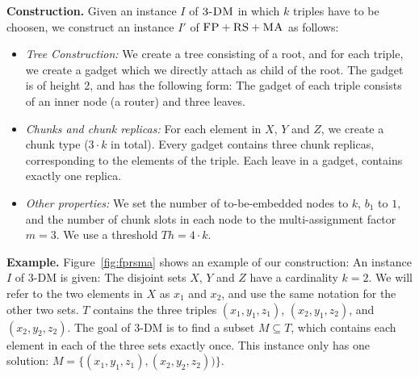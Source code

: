 \documentclass[preprint,12pt]{elsarticle}
\newcommand{\maciek}[1]{\textcolor{brown}{maciek: #1}}
\newcommand{\stefan}[1]{\textcolor{blue}{stefan: #1}}
\newcommand{\MaFactor}{m}
\newcommand{\FP}{\textsc{FP}}
\newcommand{\RS}{\textsc{RS}}
\newcommand{\MA}{\textsc{MA}}
\newcommand{\CostTrans}{\ensuremath{b_1}}
\newcommand{\TDM}{\textsc{3-DM}}
\newcommand{\Thr}{\ensuremath{Th}}
\begin{document}
\textbf{Construction.}
Given an instance $I$ of $\TDM$ in which $k$ triples have to be
choosen, we construct an instance $I'$ of
$\FP+\RS+\MA$ as follows:
\begin{itemize}
\item \emph{Tree Construction:} We create a tree consisting of a root,
and for each triple, we create a gadget which we directly attach as
child of the root. The gadget is of height 2,
and has the following form:
The gadget of each triple consists of an inner node (a router) and three leaves.
\item \emph{Chunks and chunk replicas:} For each element in $X$, $Y$ and $Z$,
 we create a chunk type
($3 \cdot k$ in total). Every gadget contains three chunk replicas,
corresponding to the elements of the triple. Each leave in a gadget, contains
exactly one replica.
\item \emph{Other properties:} We set the number of to-be-embedded nodes to $k$,
$\CostTrans$ to $1$, and the number of chunk slots in each node to the multi-assignment factor
$\MaFactor=3$.
We use a threshold $\Thr= 4
\cdot k$.
\end{itemize}

\textbf{Example.} Figure~\ref{fig:fprsma} shows an example of our construction: An
instance $I$ of 3-DM is given: The disjoint sets $X$, $Y$ and $Z$ have a
cardinality $k=2$. We will refer to the two elements in $X$ as $x_1$ and $x_2$,
and use the same notation for the other two sets. $T$ contains the three triples
$(x_1, y_1,
z_1)$, $(x_2, y_1, z_2)$, and $(x_2, y_2, z_2)$. The goal of 3-DM is to find a
subset $M \subseteq T$, which contains each element in each of the three sets
exactly once. This instance only has one solution: $M =
\{(x_1,y_1,z_1),(x_2,y_2,z_2))\}$.
\end{document}
